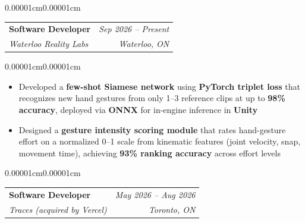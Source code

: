\documentclass[10pt, letterpaper]{article}
\makeatletter
\newenvironment{highlights}{
    \begin{itemize}[
        topsep=0.10 cm,
        parsep=0.10 cm,
        partopsep=0pt,
        itemsep=0pt,
        leftmargin=10pt
    ]
}{
    \end{itemize}
}
\newenvironment{onecolentry}{
    \begin{adjustwidth}{0.00001cm}{0.00001cm}
}{
    \end{adjustwidth}
}
\newenvironment{experienceentry}[4]{
    \begin{onecolentry}
    \begin{tabularx}{\linewidth}{@{}X r@{}}
        \textbf{#1} & #4 \\
        \textit{#2} & \textit{#3} \\
    \end{tabularx}
    \end{onecolentry}
}{}
\makeatother
\begin{document}
\vspace{0.20 cm}

\begin{experienceentry}
{Software Developer}
{Waterloo Reality Labs}
{Waterloo, ON}
{\textit{Sep 2026 -- Present}}
\end{experienceentry}

\vspace{0.10 cm}

\begin{onecolentry}
\begin{highlights}
\item Developed a \textbf{few-shot Siamese network} using \textbf{PyTorch triplet loss} that recognizes new hand gestures from only 1--3 reference clips at up to \textbf{98\% accuracy}, deployed via \textbf{ONNX} for in-engine inference in \textbf{Unity}
\item Designed a \textbf{gesture intensity scoring module} that rates hand-gesture effort on a normalized 0--1 scale from kinematic features (joint velocity, snap, movement time), achieving \textbf{93\% ranking accuracy} across effort levels
\end{highlights}
\end{onecolentry}

\vspace{0.20 cm}

\begin{experienceentry}
{Software Developer}
{Traces (acquired by Vercel)}
{Toronto, ON}
{\textit{May 2026 -- Aug 2026}}
\end{experienceentry}

\vspace{0.10 cm}
\end{document}
